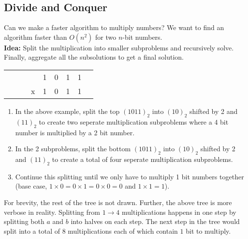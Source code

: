 \documentclass[14pt]{extarticle}
\begin{document}
    \pagebreak
    \subsection{Divide and Conquer}
    Can we make a faster algorithm to multiply numbers? We want to find an
    algorithm faster than $O(n^2)$ for two $n$-bit numbers.\\

    \textbf{Idea:} Split the multiplication into smaller subproblems
    and recursively solve. Finally, aggregate all the subsolutions to get
    a final solution.
    \begin{center}
        \begin{tabular}{ccccccccc}
            & & & & 1 & 0 & 1 & 1           \\
            & & & x & 1 & 0 & 1 & 1         \\
            \hline
        \end{tabular}
    \end{center}
    \begin{enumerate}
        \item In the above example, split the top $(1011)_2$ into $(10)_2$
            shifted by 2 and $(11)_2$ to create two seperate multiplication
            subproblems where a 4 bit number is multiplied by a 2 bit number.
        \item In the 2 subproblems, split the bottom $(1011)_2$ into $(10)_2$
            shifted by 2 and $(11)_2$ to create a total of four seperate
            multiplication subproblems.
        \item Continue this splitting until we only have to multiply 1 bit
            numbers together (base case, $1\times 0 = 0\times 1 = 0\times 0
            = 0$ and $1\times 1 = 1$).
    \end{enumerate}
    \begin{center}
    \end{center}
    For brevity, the rest of the tree is not drawn. Further, the above tree
    is more verbose in reality. Splitting from $1 \to 4$ multiplications
    happens in one step by splitting both $a$ and $b$ into halves on each
    step. The next step in the tree would split into a total of $8$ 
    multiplications each of which contain $1$ bit to multiply.\\
\end{document}
